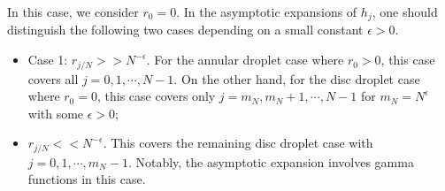 In this case, we consider $r_0 = 0$. In the asymptotic expansions of $h_j$, one should distinguish the following two cases depending on a small constant $\epsilon > 0$. 
\begin{itemize}
	\item Case 1: $r_{j/N} >> N^{-\epsilon}$. For the annular droplet case where $r_0 > 0$, this case covers all $j = 0, 1, \cdots , N-1$. On the other hand, for the disc droplet case where $r_0 = 0$, this case covers only $j = m_N, m_N + 1, \cdots , N-1$ for $m_N = N^\epsilon$ with some $\epsilon > 0$;
	\item $r_{j/N} << N^{-\epsilon}$. This covers the remaining disc droplet case with $j = 0, 1, \cdots, m_N-1$. Notably, the asymptotic expansion involves gamma functions in this case. 
\end{itemize}

